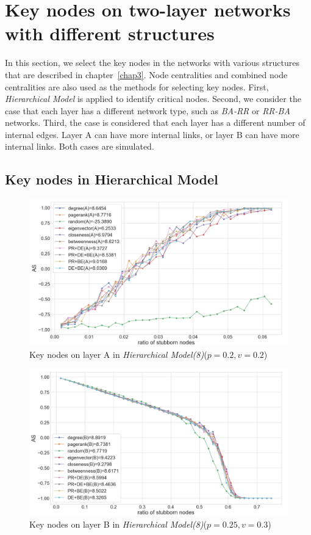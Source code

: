 \section{Key nodes on two-layer networks with different structures}
In this section, we select the key nodes in the networks with various structures that are described in chapter~\ref{chap3}. Node centralities and combined node centralities are also used as the methods for selecting key nodes. First, \textit{Hierarchical Model} is applied to identify critical nodes. Second, we consider the case that each layer has a different network type, such as \textit{BA-RR} or \textit{RR-BA} networks. Third, the case is considered that each layer has a different number of internal edges. Layer A can have more internal links, or layer B can have more internal links. Both cases are simulated. \\

\subsection{Key nodes in Hierarchical Model}
\begin{figure}[!htb]
	\centering
	\includegraphics[width=\hsize]{figure/chap5_keynode_HM_A.png}
	\caption{Key nodes on layer A in \textit{Hierarchical Model(8)}($p=0.2, v=0.2$)}
	\label{chap5_keynode_HM_A}
\end{figure}
\begin{figure}[!htb]
	\centering
	\includegraphics[width=\hsize]{figure/chap5_keynode_HM_B.png}
	\caption{Key nodes on layer B in \textit{Hierarchical Model(8)}($p=0.25, v=0.3$)}
	\label{chap5_keynode_HM_B}
\end{figure}

